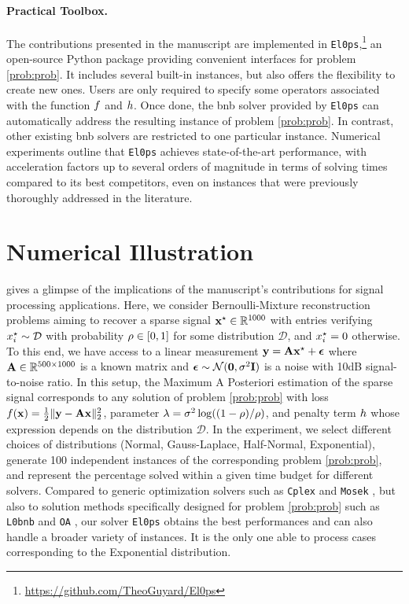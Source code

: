 \documentclass[11pt]{article}
\begin{document}
\paragraph{Practical Toolbox.}
The contributions presented in the manuscript are implemented in \texttt{El0ps},\footnote{\url{https://github.com/TheoGuyard/El0ps}} an open-source Python package providing convenient interfaces for problem \eqref{prob:prob}.
It includes several built-in instances, but also offers the flexibility to create new ones.
Users are only required to specify some operators associated with the function $f$ and $h$.
Once done, the \gls{bnb} solver provided by \texttt{El0ps} can automatically address the resulting instance of problem \eqref{prob:prob}.
In contrast, other existing \gls{bnb} solvers are restricted to one particular instance.
Numerical experiments outline that \texttt{El0ps} achieves state-of-the-art performance, with acceleration factors up to several orders of magnitude in terms of solving times compared to its best competitors, even on instances that were previously thoroughly addressed in the literature.

\section{Numerical Illustration}
\label{sec:numerics}

 gives a glimpse of the implications of the manuscript's contributions for signal processing applications.
Here, we consider Bernoulli-Mixture reconstruction problems \cite{soussen2011bernoulli} aiming to recover a sparse signal $\groundtruth \in \kR^{1000}$ with entries verifying $x_{i}^{\star} \sim \mathcal{D}$ with probability $\rho \in [0,1]$ for some distribution $\mathcal{D}$, and $x_{i}^{\star}=0$ otherwise. 
To this end, we have access to a linear measurement $\mathbf{y} = \mathbf{A}\mathbf{x}^{\star} + \boldsymbol{\epsilon}$ where $\dic \in \kR^{500 \times 1000}$ is a known matrix and $\boldsymbol{\epsilon} \sim \mathcal{N}(\mathbf{0},\sigma^2 \mathbf{I})$ is a noise with 10dB signal-to-noise ratio.
In this setup, the Maximum A Posteriori estimation of the sparse signal corresponds to any solution of problem \eqref{prob:prob} with loss $f(\mathbf{x}) = \frac{1}{2}\|\mathbf{y} - \mathbf{A}\mathbf{x}\|_2^2$, parameter $\lambda = \sigma^2\log((1-\rho)/\rho)$, and penalty term $h$ whose expression depends on the distribution $\mathcal{D}$.
In the experiment, we select different choices of distributions (Normal, Gauss-Laplace, Half-Normal, Exponential), generate 100 independent instances of the corresponding problem \eqref{prob:prob}, and represent the percentage solved within a given time budget for different solvers.
Compared to generic optimization solvers such as \texttt{Cplex} and \texttt{Mosek} \cite{kronqvist2019review}, but also to solution methods specifically designed for problem \eqref{prob:prob} such as \texttt{L0bnb} \cite{hazimeh2022sparse} and \texttt{OA} \cite{bertsimas2021unified}, our solver \texttt{El0ps} obtains the best performances and can also handle a broader variety of instances.
It is the only one able to process cases corresponding to the Exponential distribution.
\end{document}
